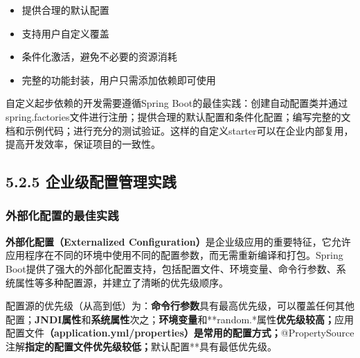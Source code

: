 \begin{enumerate}
  \begin{itemize}
  \tightlist
  \item
    提供合理的默认配置
  \item
    支持用户自定义覆盖
  \item
    条件化激活，避免不必要的资源消耗
  \item
    完整的功能封装，用户只需添加依赖即可使用
  \end{itemize}
\end{enumerate}

自定义起步依赖的开发需要遵循Spring Boot的最佳实践：创建自动配置类并通过spring.factories文件进行注册；提供合理的默认配置和条件化配置；编写完整的文档和示例代码；进行充分的测试验证。这样的自定义starter可以在企业内部复用，提高开发效率，保证项目的一致性。

\subsection{5.2.5 企业级配置管理实践}\label{ux4f01ux4e1aux7ea7ux914dux7f6eux7ba1ux7406ux5b9eux8df5}

\subsubsection{外部化配置的最佳实践}\label{ux5916ux90e8ux5316ux914dux7f6eux7684ux6700ux4f73ux5b9eux8df5}

\textbf{外部化配置（Externalized Configuration）}是企业级应用的重要特征，它允许应用程序在不同的环境中使用不同的配置参数，而无需重新编译和打包。Spring Boot提供了强大的外部化配置支持，包括配置文件、环境变量、命令行参数、系统属性等多种配置源，并建立了清晰的优先级顺序。

配置源的优先级（从高到低）为：\textbf{命令行参数}具有最高优先级，可以覆盖任何其他配置；\textbf{JNDI属性}和\textbf{系统属性}次之；\textbf{环境变量}和**random.*属性\textbf{优先级较高；}应用配置文件\textbf{（application.yml/properties）是常用的配置方式；}@PropertySource注解\textbf{指定的配置文件优先级较低；}默认配置**具有最低优先级。


